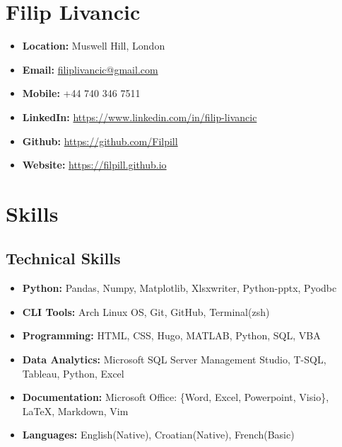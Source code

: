 \documentclass[a4paper,9pt]{article}
\date{}
\begin{document}
\section*{Filip Livancic}

\begin{itemize}[noitemsep]
    \item\textbf{Location: }Muswell Hill, London
    \item\textbf{Email: }\href{mailto:filiplivancic@gmail.com}{filiplivancic@gmail.com}
    \item\textbf{Mobile: }+44 740 346 7511
    \item\textbf{LinkedIn: }\url{https://www.linkedin.com/in/filip-livancic}
    \item\textbf{Github: }\url{https://github.com/Filpill}
    \item\textbf{Website: }\url{https://filpill.github.io}
\end{itemize}


\section*{Skills}
\subsection*{Technical Skills}
\begin{itemize}[noitemsep]
	\item \textbf{Python:} \hspace{14.8mm} Pandas, Numpy, Matplotlib, Xlsxwriter, Python-pptx, Pyodbc
	\item \textbf{CLI Tools:} \hspace{10mm} Arch Linux OS, Git, GitHub, Terminal(zsh)
	\item \textbf{Programming:} \hspace{3.3mm} HTML, CSS, Hugo, MATLAB, Python, SQL, VBA
	\item \textbf{Data Analytics:} \hspace{1mm} Microsoft SQL Server Management Studio, T-SQL, Tableau, Python, Excel
	\item \textbf{Documentation:} \hspace{0.5mm} Microsoft Office: \{Word, Excel, Powerpoint, Visio\}, LaTeX, Markdown, Vim
	\item \textbf{Languages:} \hspace{9.3mm} English(Native), Croatian(Native), French(Basic)
\end{itemize}
\end{document}
